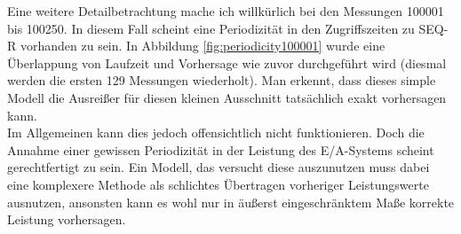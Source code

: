 \documentclass[
	12pt,
	a4paper,
	BCOR10mm,
	DIV14,
	listof=totoc,
	bibliography=totoc,
	headsepline
]{scrreprt}
\begin{document}
Eine weitere Detailbetrachtung mache ich willkürlich bei den Messungen 100001 bis 100250.
In diesem Fall scheint eine Periodizität in den Zugriffszeiten zu SEQ-R vorhanden zu sein. In Abbildung \ref{fig:periodicity100001} wurde eine Überlappung von Laufzeit und Vorhersage wie zuvor durchgeführt wird (diesmal werden die ersten 129 Messungen wiederholt). Man erkennt, dass dieses simple Modell die Ausreißer für diesen kleinen Ausschnitt tatsächlich exakt vorhersagen kann.\\
Im Allgemeinen kann dies jedoch offensichtlich nicht funktionieren.
Doch die Annahme einer gewissen Periodizität in der Leistung des E/A-Systems scheint gerechtfertigt zu sein.
Ein Modell, das versucht diese auszunutzen muss dabei eine komplexere Methode als schlichtes Übertragen vorheriger Leistungswerte ausnutzen, ansonsten kann es wohl nur in äußerst eingeschränktem Maße korrekte Leistung vorhersagen.
\end{document}
